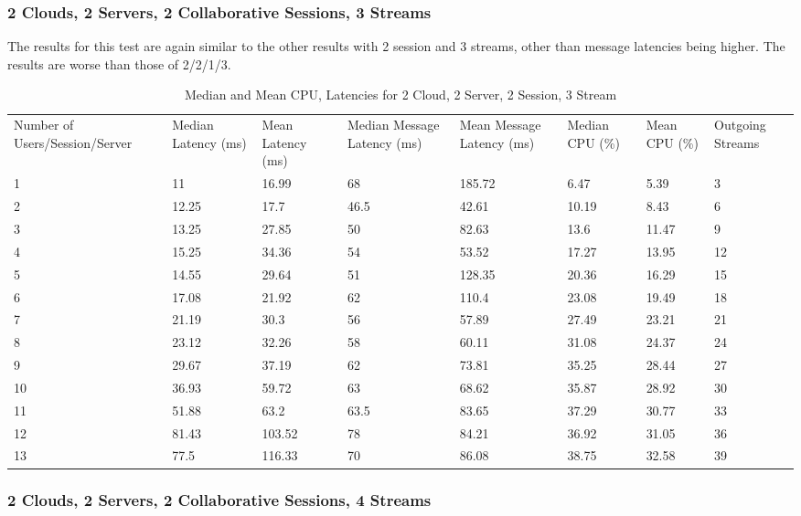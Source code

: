 \clearpage\subsubsection{2 Clouds, 2 Servers, 2 Collaborative Sessions, 3 Streams}

The results for this test are again similar to the other results with 2 session and 3 streams, other than message latencies being higher. The results are worse than those of 2/2/1/3.

\begin{table}
\caption{Median and Mean CPU, Latencies for 2 Cloud, 2 Server, 2 Session, 3 Stream}
\label{table:2cld_2serv_2sess_3str}
\begin{tabu} to\linewidth{|X[c]|X[c]|X[c]|X[c]|X[c]|X[c]|X[c]|X[c]|}
\everyrow{\hline}
\hline
Number of Users/Session/Server & Median Latency (ms) & Mean Latency (ms) & Median Message Latency (ms) & Mean Message Latency (ms) & Median CPU (\%) & Mean CPU (\%) & Outgoing Streams\\
1 & 11 & 16.99 & 68 & 185.72 & 6.47 & 5.39 & 3 \\
2 & 12.25 & 17.7 & 46.5 & 42.61 & 10.19 & 8.43 & 6 \\
3 & 13.25 & 27.85 & 50 & 82.63 & 13.6 & 11.47 & 9 \\
4 & 15.25 & 34.36 & 54 & 53.52 & 17.27 & 13.95 & 12 \\
5 & 14.55 & 29.64 & 51 & 128.35 & 20.36 & 16.29 & 15 \\
6 & 17.08 & 21.92 & 62 & 110.4 & 23.08 & 19.49 & 18 \\
7 & 21.19 & 30.3 & 56 & 57.89 & 27.49 & 23.21 & 21 \\
8 & 23.12 & 32.26 & 58 & 60.11 & 31.08 & 24.37 & 24 \\
9 & 29.67 & 37.19 & 62 & 73.81 & 35.25 & 28.44 & 27 \\
10 & 36.93 & 59.72 & 63 & 68.62 & 35.87 & 28.92 & 30 \\
11 & 51.88 & 63.2 & 63.5 & 83.65 & 37.29 & 30.77 & 33 \\
12 & 81.43 & 103.52 & 78 & 84.21 & 36.92 & 31.05 & 36 \\
13 & 77.5 & 116.33 & 70 & 86.08 & 38.75 & 32.58 & 39 \\
\end{tabu}
\end{table}

\clearpage\subsubsection{2 Clouds, 2 Servers, 2 Collaborative Sessions, 4 Streams}

